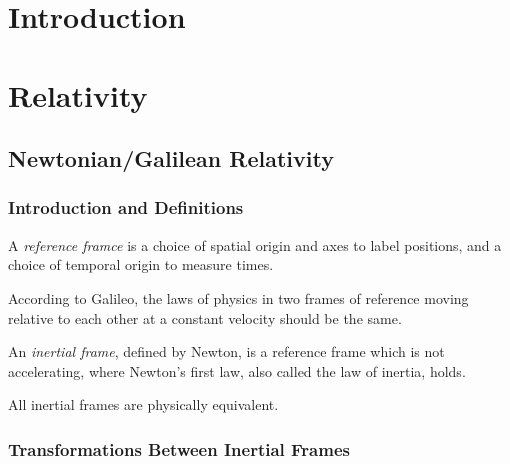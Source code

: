 \documentclass[a4paper]{article}
\begin{document}
\maketitle

\tableofcontents

\setcounter{section}{-1}
\section{Introduction}

\section{Relativity}

\subsection{Newtonian/Galilean Relativity}

\setcounter{subsubsection}{-1}
\subsubsection{Introduction and Definitions}

\begin{defi}
	A \emph{reference framce} is a choice of spatial origin and axes
	to label positions, and a choice of temporal origin to measure times.
\end{defi}

\begin{defi}
	According to Galileo, the laws of physics in two frames of reference
	moving relative to each other at a constant velocity should be the
	same.
\end{defi}

\begin{defi}
	An \emph{inertial frame}, defined by Newton, is a reference frame which
	is not accelerating, where Newton's first law, also called the law of
	inertia, holds.\\
\end{defi}

\begin{post}
	All inertial frames are physically equivalent.
\end{post}

\subsubsection{Transformations Between Inertial Frames}
\end{document}

